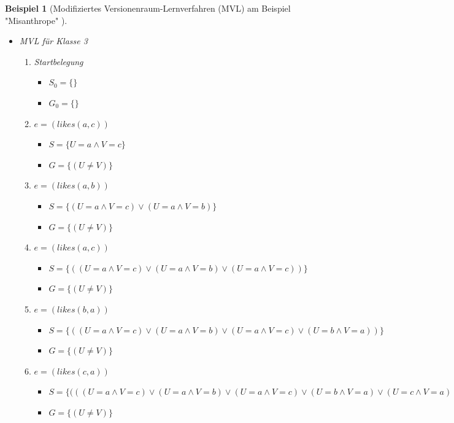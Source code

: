 \documentclass[a4paper, 11pt]{book}
\newtheorem{Bsp}{Beispiel}[section]
\begin{document}
\begin{Bsp}[Modifiziertes Versionenraum-Lernverfahren (MVL) am Beispiel "{}Misanthrope"{} ]
\begin{itemize}
\begin{enumerate}
		\begin{itemize}
			\item $ S = \{U = c \land V = b\}$ 
			\item $ G = \{(U \neq V)\} $
		\end{itemize}
		\item $ e = (likes(b,c)) $
		\begin{itemize}
			\item \item $ S = \{(U = c \land V = b) \lor (U = b \land V = c)\}$ 
			\item $ G = \{(U \neq V)\} $
		\end{itemize}
		\end{enumerate}
	\item MVL für Klasse 3
	\begin{enumerate}
		\item Startbelegung
		\begin{itemize}
			\item $ S_0 = \{\}$ 
			\item $ G_0 = \{\} $
		\end{itemize}
		\item $ e = (likes(a,c)) $
		\begin{itemize}
			\item $ S = \{U = a \land V = c\}$ 
			\item $ G = \{(U \neq V)\} $
		\end{itemize}
		\item $ e = (likes(a,b)) $
		\begin{itemize}
			\item $ S = \{(U = a \land V = c) \lor (U = a \land V = b)\}$ 
			\item $ G = \{(U \neq V)\} $
		\end{itemize}
		\item $ e = (likes(a,c)) $
		\begin{itemize}
			\item $ S = \{((U = a \land V = c) \lor (U = a \land V = b) \lor (U = a \land V = c))\}$ 
			\item $ G = \{(U \neq V)\} $
		\end{itemize}	
		\item $ e = (likes(b,a)) $
		\begin{itemize}
			\item $ S = \{((U = a \land V = c) \lor (U = a \land V = b) \lor (U = a \land V = c) \lor (U = b \land V = a))\}$ 
			\item $ G = \{(U \neq V)\} $
		\end{itemize}
		\item $ e = (likes(c,a)) $
		\begin{itemize}
			\item $ S = \{(((U = a \land V = c) \lor (U = a \land V = b) \lor (U = a \land V = c) \lor (U = b \land V = a) \lor (U = c \land V = a))\}$ 
			\item $ G = \{(U \neq V)\} $
		\end{itemize}	
	\end{enumerate}
\end{itemize}
\end{Bsp}
\end{document}
